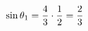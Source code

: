 \documentclass[preview]{standalone}
\begin{document}
\begin{align*}
\special{dvisvgm:raw <g id='unique000'>}\sin\theta_1 = \frac{4}{3} \cdot \frac{1}{2} = \frac{2}{3}\special{dvisvgm:raw </g>}
\end{align*}
\end{document}
